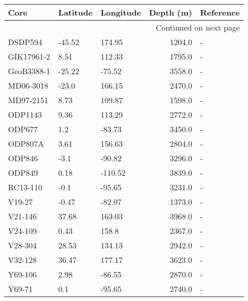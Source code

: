 \begin{longtable}{lllrl}

       Core & Latitude & Longitude &  Depth (m) & Reference \\

\endhead

\multicolumn{5}{r}{{Continued on next page}} \\

\endfoot


\endlastfoot
    DSDP594 &   -45.52 &    174.95 &     1204.0 &         - \\
 GIK17961-2 &     8.51 &    112.33 &     1795.0 &         - \\
 GeoB3388-1 &   -25.22 &    -75.52 &     3558.0 &         - \\
  MD06-3018 &    -23.0 &    166.15 &     2470.0 &         - \\
  MD97-2151 &     8.73 &    109.87 &     1598.0 &         - \\
    ODP1143 &     9.36 &    113.29 &     2772.0 &         - \\
     ODP677 &      1.2 &    -83.73 &     3450.0 &         - \\
    ODP807A &     3.61 &    156.63 &     2804.0 &         - \\
     ODP846 &     -3.1 &    -90.82 &     3296.0 &         - \\
     ODP849 &     0.18 &   -110.52 &     3839.0 &         - \\
   RC13-110 &     -0.1 &    -95.65 &     3231.0 &         - \\
     V19-27 &    -0.47 &    -82.07 &     1373.0 &         - \\
    V21-146 &    37.68 &    163.03 &     3968.0 &         - \\
    V24-109 &     0.43 &     158.8 &     2367.0 &         - \\
    V28-304 &    28.53 &    134.13 &     2942.0 &         - \\
    V32-128 &    36.47 &    177.17 &     3623.0 &         - \\
    Y69-106 &     2.98 &    -86.55 &     2870.0 &         - \\
     Y69-71 &      0.1 &    -95.65 &     2740.0 &         - \\
\end{longtable}
